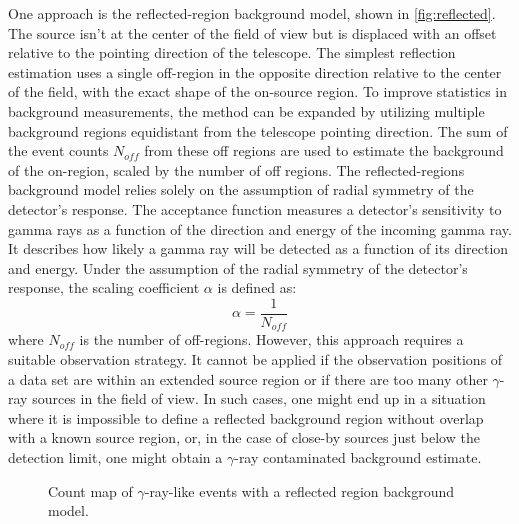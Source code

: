 One approach is the reflected-region background model, shown in \autoref{fig:reflected}. The source isn't at the center of the field of view but is displaced with an offset relative to the pointing direction of the telescope. The simplest reflection estimation uses a single off-region in the opposite direction relative to the center of the field, with the exact shape of the on-source region. To improve statistics in background measurements, the method can be expanded by utilizing multiple background regions equidistant from the telescope pointing direction. The sum of the event counts $N_{off}$ from these off regions are used to estimate the background of the on-region, scaled by the number of off regions. 
The reflected-regions background model relies solely on the assumption of radial symmetry of the detector's response. The acceptance function measures a detector's sensitivity to gamma rays as a function of the direction and energy of the incoming gamma ray. It describes how likely a gamma ray will be detected as a function of its direction and energy. Under the assumption of the radial symmetry of the detector's response, the scaling coefficient $\alpha$ is defined as:  
$$
\alpha=\frac{1}{N_{off}}
$$
where $N_{off}$ is the number of off-regions.
However, this approach requires a suitable observation strategy. It cannot be applied if the observation positions of a data set are within an extended source region or if there are too many other $\gamma$-ray sources in the field of view. In such cases, one might end up in a situation where it is impossible to define a reflected background region without overlap with a known source region, or, in the case of close-by sources just below the detection limit, one might obtain a $\gamma$-ray contaminated background estimate.
 \begin{figure}[t]
\centering

\caption{Count map of $\gamma$-ray-like events with a reflected region background model.}
\label{fig:reflected}
\end{figure}



